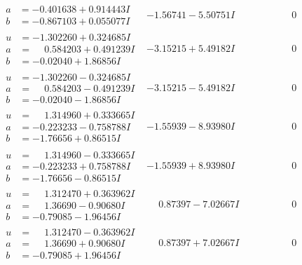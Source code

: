 \documentclass[1p]{elsarticle_modified}
\theoremstyle{definition}
\begin{document}
$$\begin{array}{c|c|c}
\begin{aligned}
a &= -0.401638 + 0.914443 I \\
b &= -0.867103 + 0.055077 I\end{aligned}
 & -1.56741 - 5.50751 I & \phantom{-0.000000 } 0 \\ \hline\begin{aligned}
u &= -1.302260 + 0.324685 I \\
a &= \phantom{-}0.584203 + 0.491239 I \\
b &= -0.02040 + 1.86856 I\end{aligned}
 & -3.15215 + 5.49182 I & \phantom{-0.000000 } 0 \\ \hline\begin{aligned}
u &= -1.302260 - 0.324685 I \\
a &= \phantom{-}0.584203 - 0.491239 I \\
b &= -0.02040 - 1.86856 I\end{aligned}
 & -3.15215 - 5.49182 I & \phantom{-0.000000 } 0 \\ \hline\begin{aligned}
u &= \phantom{-}1.314960 + 0.333665 I \\
a &= -0.223233 - 0.758788 I \\
b &= -1.76656 + 0.86515 I\end{aligned}
 & -1.55939 - 8.93980 I & \phantom{-0.000000 } 0 \\ \hline\begin{aligned}
u &= \phantom{-}1.314960 - 0.333665 I \\
a &= -0.223233 + 0.758788 I \\
b &= -1.76656 - 0.86515 I\end{aligned}
 & -1.55939 + 8.93980 I & \phantom{-0.000000 } 0 \\ \hline\begin{aligned}
u &= \phantom{-}1.312470 + 0.363962 I \\
a &= \phantom{-}1.36690 - 0.90680 I \\
b &= -0.79085 - 1.96456 I\end{aligned}
 & \phantom{-}0.87397 - 7.02667 I & \phantom{-0.000000 } 0 \\ \hline\begin{aligned}
u &= \phantom{-}1.312470 - 0.363962 I \\
a &= \phantom{-}1.36690 + 0.90680 I \\
b &= -0.79085 + 1.96456 I\end{aligned}
 & \phantom{-}0.87397 + 7.02667 I & \phantom{-0.000000 } 0 \\ \hline\begin{aligned}

\end{aligned}
\end{array}$$
\end{document}
